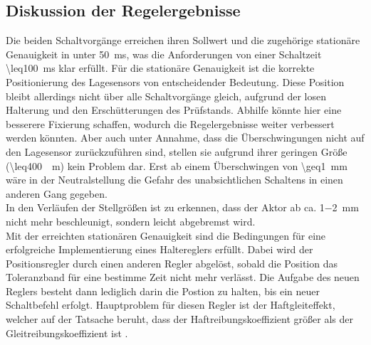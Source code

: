 \subsection{Diskussion der Regelergebnisse}\label{diskreg}
Die beiden Schaltvorgänge erreichen ihren Sollwert und die zugehörige stationäre Genauigkeit in unter \SI{50}{ms}, was die Anforderungen von einer Schaltzeit \SI{\leq100}{ms} klar erfüllt. Für die stationäre Genauigkeit ist die korrekte Positionierung des Lagesensors von entscheidender Bedeutung. Diese Position bleibt allerdings nicht über alle Schaltvorgänge gleich, aufgrund der losen Halterung und den Erschütterungen des Prüfstands. Abhilfe könnte hier eine besserere Fixierung schaffen, wodurch die Regelergebnisse weiter verbessert werden könnten. Aber auch unter Annahme, dass die Überschwingungen nicht auf den Lagesensor zurückzuführen sind, stellen sie aufgrund ihrer geringen Größe (\SI{\leq400}{\mu m}) kein Problem dar. Erst ab einem Überschwingen von \SI{\geq1}{mm} wäre in der Neutralstellung die Gefahr des unabsichtlichen Schaltens in einen anderen Gang gegeben.\\
In den Verläufen der Stellgrößen ist zu erkennen, dass der Aktor ab ca. \SI{1-2}{mm} nicht mehr beschleunigt, sondern leicht abgebremst wird.\\
Mit der erreichten stationären Genauigkeit sind die Bedingungen für eine erfolgreiche Implementierung eines Haltereglers erfüllt. Dabei wird der Positionsregler durch einen anderen Regler abgelöst, sobald die Position das Toleranzband für eine bestimme Zeit nicht mehr verlässt. Die Aufgabe des neuen Reglers besteht dann lediglich darin die Postion zu halten, bis ein neuer Schaltbefehl erfolgt. Hauptproblem für diesen Regler ist der Haftgleiteffekt, welcher auf der Tatsache beruht, dass der Haftreibungskoeffizient größer als der Gleitreibungskoeffizient ist \cite{F.P.Bowden2001}. 

